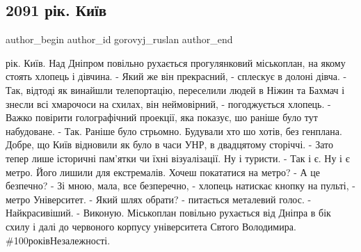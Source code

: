  
 
 
 
 
 
\subsection{2091 рік. Київ}
\label{sec:10_09_2021.fb.gorovyj_ruslan.1.2091_kiev}
 
\ifcmt
 author_begin
   author_id gorovyj_ruslan
 author_end
\fi

 рік. Київ.
Над Дніпром повільно рухається прогулянковий міськоплан, на якому стоять хлопець і дівчина. 
- Який же він прекрасний, - сплескує в долоні дівча. 
- Так, відтоді як винайшли телепортацію, переселили людей в Ніжин та Бахмач і знесли всі хмарочоси на схилах, він неймовірний, - погоджується хлопець.
- Важко повірити голографічний проекції, яка показує, шо раніше було тут набудоване.
- Так. Раніше було стрьомно. Будували хто шо хотів, без генплана. Добре, що Київ відновили як було в часи УНР, в двадцятому сторіччі.
- Зато тепер лише історичні пам’ятки чи їхні візуалізації. Ну і туристи.
- Так і є. Ну і є метро. Його лишили для екстремалів. Хочеш покататися на метро?
- А це безпечно?
- Зі мною, мала, все безперечно, - хлопець натискає кнопку на пульті, - метро Університет. 
- Який шлях обрати? - питається металевий голос.
- Найкрасивіший.
- Виконую.
Міськоплан повільно рухається від Дніпра в бік схилу і далі до червоного корпусу університета Свтого Володимира.
\#100роківНезалежності.
\restorecr

